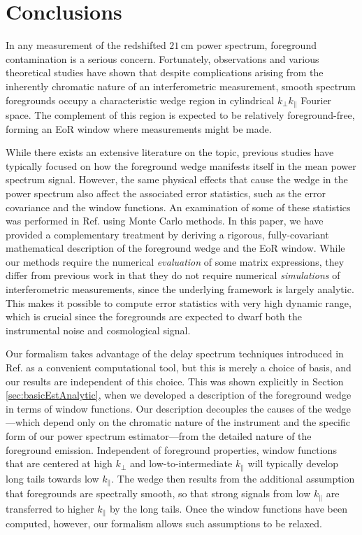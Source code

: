 \documentclass[twocolumn,aps,prd,nofootinbib,showpacs]{revtex4-1}
\begin{document}
\section{Conclusions}
\label{sec:Conclusions}
In any measurement of the redshifted $21\,\textrm{cm}$ power spectrum, foreground contamination is a serious concern.  Fortunately, observations and various theoretical studies have shown that despite complications arising from the inherently chromatic nature of an interferometric measurement, smooth spectrum foregrounds occupy a characteristic wedge region in cylindrical $k_\perp k_\parallel$ Fourier space.  The complement of this region is expected to be relatively foreground-free, forming an EoR window where measurements might be made.

While there exists an extensive literature on the topic, previous studies have typically focused on how the foreground wedge manifests itself in the mean power spectrum signal.  However, the same physical effects that cause the wedge in the power spectrum also affect the associated error statistics, such as the error covariance and the window functions.  An examination of some of these statistics was performed in Ref. \cite{Trott2012} using Monte Carlo methods.  In this paper, we have provided a complementary treatment by deriving a rigorous, fully-covariant mathematical description of the foreground wedge and the EoR window.  While our methods require the numerical \emph{evaluation} of some matrix expressions, they differ from previous work in that they do not require numerical \emph{simulations} of interferometric measurements, since the underlying framework is largely analytic.  This makes it possible to compute error statistics with very high dynamic range, which is crucial since the foregrounds are expected to dwarf both the instrumental noise and cosmological signal.

Our formalism takes advantage of the delay spectrum techniques introduced in Ref. \cite{Parsons2012b} as a convenient computational tool, but this is merely a choice of basis, and our results are independent of this choice.  This was shown explicitly in Section \ref{sec:basicEstAnalytic}, when we developed a description of the foreground wedge in terms of window functions.  Our description decouples the causes of the wedge---which depend only on the chromatic nature of the instrument and the specific form of our power spectrum estimator---from the detailed nature of the foreground emission.  Independent of foreground properties, window functions that are centered at high $k_\perp$ and low-to-intermediate $k_\parallel$ will typically develop long tails towards low $k_\parallel$.  The wedge then results from the additional assumption that foregrounds are spectrally smooth, so that strong signals from low $k_\parallel$ are transferred to higher $k_\parallel$ by the long tails.  Once the window functions have been computed, however, our formalism allows such assumptions to be relaxed.
\end{document}
